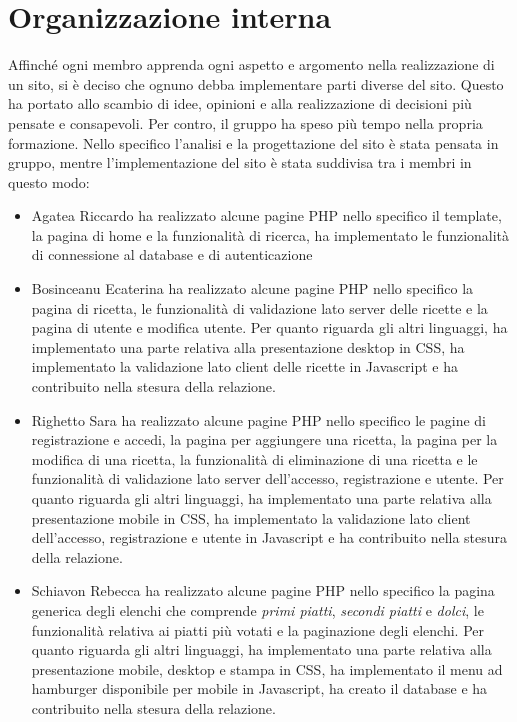 \section{Organizzazione interna}
Affinché ogni membro apprenda ogni aspetto e argomento nella realizzazione di un sito, si è deciso che ognuno debba implementare parti diverse del sito. Questo ha portato allo scambio di idee, opinioni e alla realizzazione di decisioni più pensate e consapevoli. Per contro, il gruppo ha speso più tempo nella propria formazione.\newline
Nello specifico l'analisi e la progettazione del sito è stata pensata in gruppo, mentre l'implementazione del sito è stata suddivisa tra i membri in questo modo:
\begin{itemize}
	\item Agatea Riccardo ha realizzato alcune pagine PHP nello specifico il template, la pagina di home e la funzionalità di ricerca, ha implementato le funzionalità di connessione al database e di autenticazione
	\item Bosinceanu Ecaterina ha realizzato alcune pagine PHP nello specifico la pagina di ricetta, le funzionalità di validazione lato server delle ricette e la pagina di utente e modifica utente. Per quanto riguarda gli altri linguaggi, ha implementato una parte relativa alla presentazione desktop in CSS, ha implementato la validazione lato client delle ricette in Javascript e ha contribuito nella stesura della relazione.
	\item Righetto Sara ha realizzato alcune pagine PHP nello specifico le pagine di registrazione e accedi, la pagina per aggiungere una ricetta, la pagina per la modifica di una ricetta, la funzionalità di eliminazione di una ricetta e le funzionalità di validazione lato server dell'accesso, registrazione e utente. Per quanto riguarda gli altri linguaggi, ha implementato una parte relativa alla presentazione mobile in CSS, ha implementato la validazione lato client dell'accesso, registrazione e utente in Javascript e ha contribuito nella stesura della relazione.
	\item Schiavon Rebecca ha realizzato alcune pagine PHP nello specifico la pagina generica degli elenchi che comprende \textit{primi piatti}, \textit{secondi piatti} e \textit{dolci}, le funzionalità relativa ai piatti più votati e la paginazione degli elenchi. Per quanto riguarda gli altri linguaggi, ha implementato una parte relativa alla presentazione mobile, desktop e stampa in CSS, ha implementato il menu ad hamburger disponibile per mobile in Javascript, ha creato il database e ha contribuito nella stesura della relazione.
\end{itemize}
